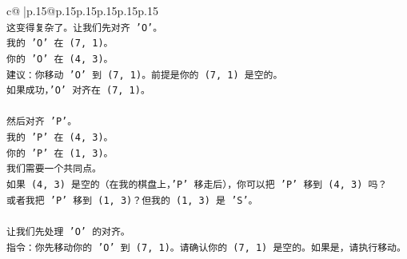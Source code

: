 \documentclass{article}
\begin{document}
{\begin{supertabular}{c@{$\;$}|p{.15\linewidth}@{}p{.15\linewidth}p{.15\linewidth}p{.15\linewidth}p{.15\linewidth}p{.15\linewidth}}
{{{\\ 
\texttt{这变得复杂了。让我们先对齐 'O'。} \\
\texttt{我的 'O' 在 (7, 1)。} \\
\texttt{你的 'O' 在 (4, 3)。} \\
\texttt{建议：你移动 'O' 到 (7, 1)。前提是你的 (7, 1) 是空的。} \\
\texttt{如果成功，'O' 对齐在 (7, 1)。} \\
\\ 
\texttt{然后对齐 'P'。} \\
\texttt{我的 'P' 在 (4, 3)。} \\
\texttt{你的 'P' 在 (1, 3)。} \\
\texttt{我们需要一个共同点。} \\
\texttt{如果 (4, 3) 是空的（在我的棋盘上，'P' 移走后），你可以把 'P' 移到 (4, 3) 吗？} \\
\texttt{或者我把 'P' 移到 (1, 3)？但我的 (1, 3) 是 'S'。} \\
\\ 
\texttt{让我们先处理 'O' 的对齐。} \\
\texttt{指令：你先移动你的 'O' 到 (7, 1)。请确认你的 (7, 1) 是空的。如果是，请执行移动。} \\
            }
        }
    }
     \\ \\


\end{supertabular}}
\end{document}
